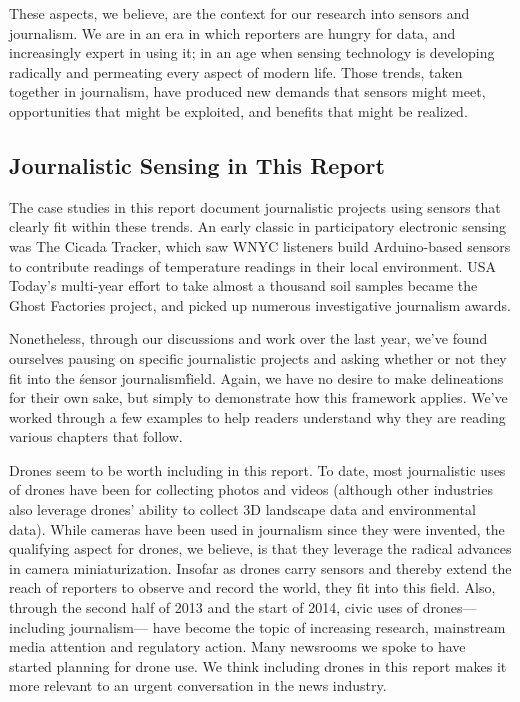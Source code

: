 These aspects, we believe, are the context for our research into sensors and
journalism. We are in an era in which reporters are hungry for data, and
increasingly expert in using it; in an age when sensing technology is developing
radically and permeating every aspect of modern life. Those trends,
taken together in journalism, have produced new demands that sensors
might meet, opportunities that might be exploited, and benefits that might
be realized.


\subsection{Journalistic Sensing in This Report}
The case studies in this report document journalistic projects using sensors
that clearly fit within these trends. An early classic in participatory electronic
sensing was The Cicada Tracker, which saw WNYC listeners build
Arduino-based sensors to contribute readings of temperature readings in
their local environment. USA Today's multi-year effort to take almost a
thousand soil samples became the Ghost Factories project, and picked up
numerous investigative journalism awards.

Nonetheless, through our discussions and work over the last year, we've
found ourselves pausing on specific journalistic projects and asking whether
or not they fit into the \'sensor journalism\' field. Again, we have no desire to
make delineations for their own sake, but simply to demonstrate how this
framework applies. We've worked through a few examples to help readers
understand why they are reading various chapters that follow.

Drones seem to be worth including in this report. To date, most journalistic
uses of drones have been for collecting photos and videos (although other
industries also leverage drones' ability to collect 3D landscape data and
environmental data). While cameras have been used in journalism since
they were invented, the qualifying aspect for drones, we believe, is that they
leverage the radical advances in camera miniaturization. Insofar as drones
carry sensors and thereby extend the reach of reporters to observe and
record the world, they fit into this field. Also, through the second half of
2013 and the start of 2014, civic uses of drones—including journalism—
have become the topic of increasing research, mainstream media attention
and regulatory action. Many newsrooms we spoke to have started planning
for drone use. We think including drones in this report makes it more relevant
to an urgent conversation in the news industry.

